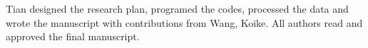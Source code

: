 Tian designed the research plan, programed the codes, processed the
data and wrote the manuscript with contributions from Wang, Koike.
All authors read and approved the final manuscript.